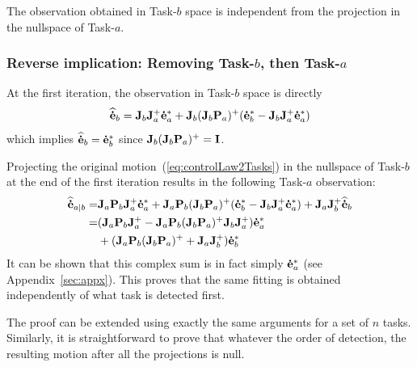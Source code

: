 \documentclass[letterpaper, 10pt, conference]{ieeeconf}      %
\begin{document}
The observation obtained in Task-$b$ space is independent from the
projection in the nullspace of Task-$a$.

\subsubsection{Reverse implication: Removing Task-$b$, then Task-$a$}

At the first iteration, the observation in Task-$b$ space is directly
\begin{equation*}
{\mathbf{\widehat{\dot{e}}}}_{b}  = {\mathbf{J}}_{b} {\mathbf{J}}_{a}^+ {\mathbf{\dot{e}}}_{a}^* + {\mathbf{J}}_{b} ( {\mathbf{J}}_{b} {\mathbf{P}}_{a} )^+ ( {\mathbf{\dot{e}}}_{b}^* - {\mathbf{J}}_{b} {\mathbf{J}}_{a}^+ {\mathbf{\dot{e}}}_{a}^* )
\end{equation*}
which implies ${\mathbf{\widehat{\dot{e}}}}_{b} = {\mathbf{\dot{e}}}_{b}^*$ since ${\mathbf{J}}_{b} ( {\mathbf{J}}_{b} {\mathbf{P}}_{a} )^+ = {\mathbf{I}}$.

Projecting the original motion~(\ref{eq:controlLaw2Tasks}) in the nullspace of Task-$b$ at the
end of the first iteration results in the following Task-$a$ observation:
\begin{align*}
{\mathbf{\widehat{\dot{e}}}}_{a|b} =& {\mathbf{J}}_{a} {\mathbf{P}}_{b} {\mathbf{J}}_{a}^+ {\mathbf{\dot{e}}}_{a}^* +
 {\mathbf{J}}_{a} {\mathbf{P}}_{b} ({\mathbf{J}}_{b} {\mathbf{P}}_{a} )^+ ( {\mathbf{\dot{e}}}_{b}^* - {\mathbf{J}}_{b} {\mathbf{J}}_{a}^+ {\mathbf{\dot{e}}}_{a}^*)
+ {\mathbf{J}}_{a} {\mathbf{J}}_{b}^+ {\mathbf{\widehat{\dot{e}}}}_{b} \\
=& ({\mathbf{J}}_{a} {\mathbf{P}}_{b} {\mathbf{J}}_{a}^+ - {\mathbf{J}}_{a} {\mathbf{P}}_{b} ({\mathbf{J}}_{b} {\mathbf{P}}_{a} )^+ {\mathbf{J}}_{b} {\mathbf{J}}_{a}^+) {\mathbf{\dot{e}}}_{a}^* \\
&+ ({\mathbf{J}}_{a} {\mathbf{P}}_{b} ({\mathbf{J}}_{b} {\mathbf{P}}_{a} )^+ + {\mathbf{J}}_{a} {\mathbf{J}}_{b}^+) {\mathbf{\dot{e}}}_{b}^*
\end{align*}
It can be shown that this complex sum is in fact simply ${\mathbf{\dot{e}}}_{a}^*$ (see Appendix~\ref{sec:appx}).
%
This proves that the same fitting is obtained independently of what task is
detected first.  \QED

\medskip
 The proof can be extended using exactly the same arguments for
a set of $n$ tasks.
Similarly, it is straightforward to prove that whatever the order of detection, 
the resulting motion after all the projections is null.
\end{document}
